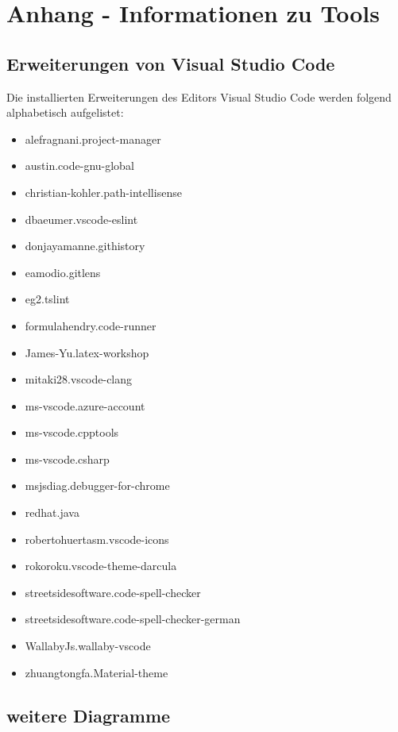 \chapter{Anhang - Informationen zu Tools}
\label{cha:Anhang_Info}

\section{Erweiterungen von Visual Studio Code}
\label{sec:extensions}
Die installierten Erweiterungen des Editors Visual Studio Code werden folgend alphabetisch aufgelistet: 
\begin{multicols}{2}
	\begin{itemize}
		\item alefragnani.project-manager
		\item austin.code-gnu-global
		\item christian-kohler.path-intellisense
		\item dbaeumer.vscode-eslint
		\item donjayamanne.githistory
		\item eamodio.gitlens
		\item eg2.tslint
		\item formulahendry.code-runner
		\item James-Yu.latex-workshop
		\item mitaki28.vscode-clang	
	\end{itemize}
	\columnbreak
	\begin{itemize}
		\item ms-vscode.azure-account
		\item ms-vscode.cpptools
		\item ms-vscode.csharp
		\item msjsdiag.debugger-for-chrome
		\item redhat.java
		\item robertohuertasm.vscode-icons
		\item rokoroku.vscode-theme-darcula
		\item streetsidesoftware.code-spell-checker
		\item streetsidesoftware.code-spell-checker-german
		\item WallabyJs.wallaby-vscode
		\item zhuangtongfa.Material-theme
	\end{itemize}
\end{multicols}

\section{weitere Diagramme}
\label{sec:additionalDiagrams}


